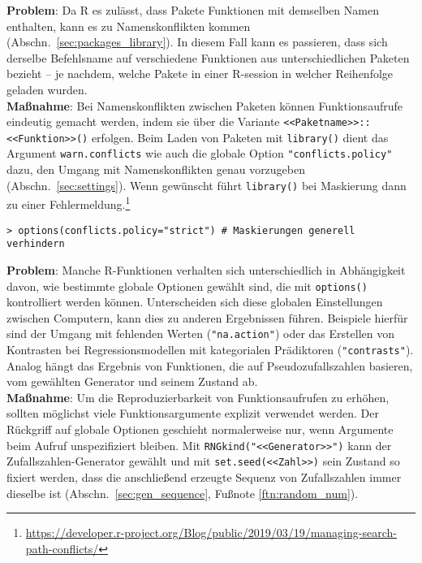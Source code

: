 \textbf{Problem}: Da R es zulässt, dass Pakete Funktionen mit demselben Namen enthalten, kann es zu Namenskonflikten kommen (Abschn.\ \ref{sec:packages_library}). In diesem Fall kann es passieren, dass sich derselbe Befehlsname auf verschiedene Funktionen aus unterschiedlichen Paketen bezieht -- je nachdem, welche Pakete in einer R-session in welcher Reihenfolge geladen wurden.\\
\textbf{Maßnahme}: Bei Namenskonflikten zwischen Paketen können Funktionsaufrufe eindeutig gemacht werden, indem sie über die Variante \lstinline!<<Paketname>>::<<Funktion>>()! erfolgen. Beim Laden von Paketen mit \lstinline!library()! dient das Argument \lstinline!warn.conflicts! wie auch die globale Option \lstinline!"conflicts.policy"! dazu, den Umgang mit Namenskonflikten genau vorzugeben (Abschn.\ \ref{sec:settings}). Wenn gewünscht führt \lstinline!library()! bei Maskierung dann zu einer Fehlermeldung.\footnote{\url{https://developer.r-project.org/Blog/public/2019/03/19/managing-search-path-conflicts/}}
\begin{lstlisting}
> options(conflicts.policy="strict") # Maskierungen generell verhindern
\end{lstlisting}

\textbf{Problem}: Manche R-Funktionen verhalten sich unterschiedlich in Abhängigkeit davon, wie bestimmte globale Optionen gewählt sind, die mit \lstinline!options()! kontrolliert werden können. Unterscheiden sich diese globalen Einstellungen zwischen Computern, kann dies zu anderen Ergebnissen führen. Beispiele hierfür sind der Umgang mit fehlenden Werten (\lstinline!"na.action"!) oder das Erstellen von Kontrasten bei Regressionsmodellen mit kategorialen Prädiktoren (\lstinline!"contrasts"!). Analog hängt das Ergebnis von Funktionen, die auf Pseudozufallszahlen basieren, vom gewählten Generator und seinem Zustand ab.\\
\textbf{Maßnahme}: Um die Reproduzierbarkeit von Funktionsaufrufen zu erhöhen, sollten möglichst viele Funktionsargumente explizit verwendet werden. Der Rückgriff auf globale Optionen geschieht normalerweise nur, wenn Argumente beim Aufruf unspezifiziert bleiben. Mit  \lstinline!RNGkind("<<Generator>>")! kann der Zufallszahlen-Generator gewählt und mit  \lstinline!set.seed(<<Zahl>>)! sein Zustand so fixiert werden, dass die anschließend erzeugte Sequenz von Zufallszahlen immer dieselbe ist (Abschn.\ \ref{sec:gen_sequence}, Fußnote \ref{ftn:random_num}).

